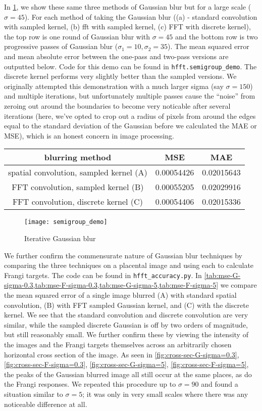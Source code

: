 In \cref{fig:semigroup-demo}, we show these same three methods of Gaussian blur but for a large scale
($\sigma=45$). For each method of taking the Gaussian blur ((a) - standard convolution with sampled kernel, (b) fft with sampled kernel, (c) FFT with discrete kernel), the top row is one round of Gaussian blur with $\sigma=45$ and the bottom row is two progressive passes of Gaussian blur ($\sigma_1 = 10, \sigma_2 = 35$). The mean squared error and mean absolute error between the one-pass and two-pass versions are outputted below. Code for this demo can be found in \texttt{hfft.semigroup\_demo}.
The discrete kernel performs very slightly better than the sampled versions. We originally attempted
this demonstration with a much larger sigma (say $\sigma=150$) and multiple iterations, but unfortunately multiple passes cause the ``noise'' from zeroing out around the boundaries to become very noticable after several iterations (here, we've opted to crop out a radius of pixels from around the edges equal to the standard deviation of the Gaussian before we calculated the MAE or MSE), which is an honest concern in image processing.

\begin{table}
  \centering
  \begin{tabular}{c|cc}
    blurring method   & MSE & MAE \\
    \hline
    spatial convolution, sampled kernel (A) & 0.00054426 & 0.02015643 \\
    FFT convolution, sampled kernel (B) & 0.00055205 & 0.02029916 \\
    FFT convolution, discrete kernel (C) & 0.00054406 & 0.02015336
  \end{tabular}
\end{table}


\begin{figure}
  \texttt{[image: semigroup\_demo]}
  \caption{Iterative Gaussian blur}
  \label{fig:semigroup-demo}
\end{figure}

We further confirm the commensurate nature of Gaussian blur techniques by comparing the three techniques on a placental image and using each to calculate Frangi targets. The code can be found in \texttt{hfft\_accuracy.py}. In \cref{tab:mse-G-sigma-0.3,tab:mse-F-sigma-0.3,tab:mse-G-sigma-5,tab:mse-F-sigma-5} we compare the mean squared error of a single image blurred (A) with standard spatial convolution, (B) with FFT sampled Gaussian kernel, and (C) with the discrete kernel. We see that the standard convolution and discrete convolution are very similar, while the sampled discrete Gaussian is off by two orders of magnitude, but still reasonably small. We further confirm these by viewing the intensity of the images and the Frangi targets themselves across an arbitrarily chosen horizontal cross section of the image. As seen in \cref{fig:cross-sec-G-sigma=0.3}, \cref{fig:cross-sec-F-sigma=0.3},
\cref{fig:cross-sec-G-sigma=5}, \cref{fig:cross-sec-F-sigma=5}, the peaks of the Gaussian blurred image all still occur at the same places, as do the Frangi responses. We repeated this procedure up to $\sigma=90$ and found a situation similar to $\sigma=5$; it was only in very small scales where there was any noticeable difference at all.



